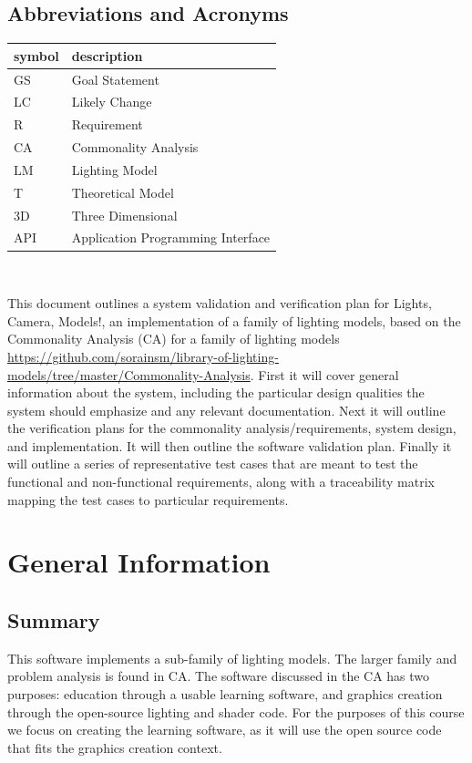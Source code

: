\documentclass[12pt, titlepage]{article}
\begin{document}
\subsection{Abbreviations and Acronyms}

\renewcommand{\arraystretch}{1.2}
\begin{tabular}{l l} 
	\toprule		
	\textbf{symbol} & \textbf{description}\\
	\midrule 
	GS & Goal Statement\\
	LC & Likely Change\\
	R & Requirement\\
	CA & Commonality Analysis \\
	LM & Lighting Model\\
	T & Theoretical Model\\
	3D & Three Dimensional \\
	API & Application Programming Interface \\
	\bottomrule
\end{tabular}\\

\newpage


This document outlines a system validation and verification plan for Lights, 
Camera, Models!, an implementation of a family of lighting models, based on the 
Commonality Analysis (CA) for a family of lighting models 
\url{https://github.com/sorainsm/library-of-lighting-models/tree/master/Commonality-Analysis}.
First it will cover general information about the system, including the
particular design qualities the system should emphasize and any relevant
documentation. Next it will outline the verification plans for the commonality
analysis/requirements, system design, and implementation. It will then outline
the software validation plan.  Finally it will outline a series of
representative test cases that are meant to test the functional and
non-functional requirements, along with a traceability matrix mapping the test
cases to particular requirements.

\section{General Information}

\subsection{Summary}
This software implements a sub-family of lighting models. The larger family and 
problem analysis is found in CA. The software discussed in the CA has two 
purposes: education through a usable learning software, and graphics creation 
through the open-source lighting and shader code. For the purposes of  this 
course we focus on creating the learning software, as it will use the open 
source code that fits the graphics creation context.
\end{document}
